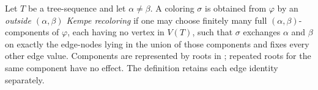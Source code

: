 \begin{definition}
Let $T$ be a tree-sequence and let $\alpha\ne\beta$.  A coloring
$\sigma$ is obtained from $\varphi$ by an
\emph{outside $(\alpha,\beta)$ Kempe recoloring} if one may choose
finitely many full $(\alpha,\beta)$-components of $\varphi$, each having
no vertex in $V(T)$, such that $\sigma$ exchanges $\alpha$ and $\beta$
on exactly the edge-nodes lying in the union of those components and
fixes every other edge value.  Components are represented by roots in
; repeated roots for the same component have
no effect.  The definition retains each edge identity separately.
\end{definition}
